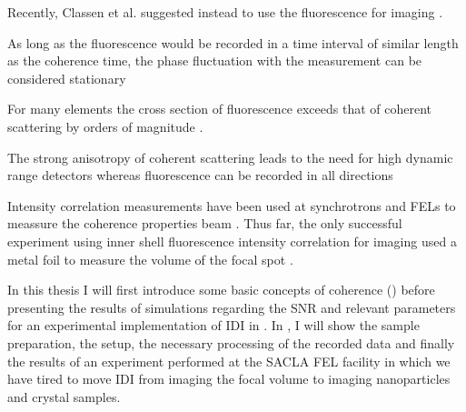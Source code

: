  
 Recently, Classen et al. suggested instead to use the fluorescence for imaging \cite{classen2017}.

As long as the fluorescence would be recorded in a time interval of similar length as the coherence time, the phase fluctuation with the measurement can be considered stationary



For many elements the cross section of fluorescence exceeds that of coherent scattering by orders of magnitude \cite{xraylib}.



The strong anisotropy of coherent scattering leads to the need for high dynamic range detectors  whereas fluorescence can be recorded in all directions


Intensity correlation measurements have been used at synchrotrons and FELs to meassure the coherence properties beam \cite{yabashi2002,singer2013,inoue2019,gorobtsov2018}. Thus far, the only successful experiment using inner shell fluorescence intensity correlation for imaging used a metal foil to measure the volume of the focal spot \cite{nakumura2020}.


In this thesis I will first introduce some basic concepts of coherence () before presenting the results of simulations regarding the SNR and relevant parameters for an experimental implementation of IDI in . In , I will show the sample preparation, the setup, the necessary processing of the recorded data and finally the results of an experiment performed at the SACLA FEL facility in which we have tired to move IDI from imaging the focal volume to imaging nanoparticles and crystal samples.

\cleardoublepage
